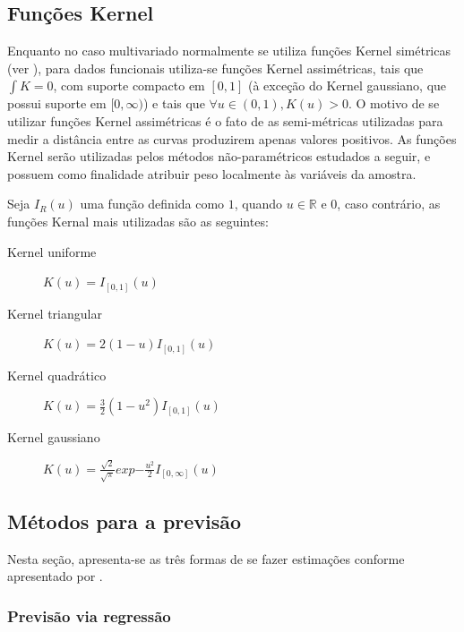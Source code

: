 \documentclass[
	12pt,				%
	openright,			%
	oneside,			%
	a4paper,			%
	english,			%
	brazil				%
	]{dissertacao-ufrgs-abntex2}
\begin{document}
\subsection{Funções Kernel}

Enquanto no caso multivariado normalmente se utiliza funções Kernel simétricas (ver ), para dados funcionais utiliza-se funções Kernel assimétricas, tais que $\int K = 0$, com suporte compacto em $[0,1]$ (à exceção do Kernel gaussiano, que possui suporte em $[0,\infty)$) e tais que $\forall u \in (0,1), K(u) > 0$. O motivo de se utilizar funções Kernel assimétricas é o fato de as semi-métricas utilizadas para medir a distância entre as curvas produzirem apenas valores positivos. As funções Kernel serão utilizadas pelos métodos não-paramétricos estudados a seguir, e possuem como finalidade atribuir peso localmente às variáveis da amostra.

Seja $I_R(u)$ uma função definida como $1$, quando $u \in \mathbb{R}$ e 0, caso contrário, as funções Kernal mais utilizadas são as seguintes:
\begin{description}
	\item[Kernel uniforme] $K(u)= I_{[0,1]}(u)$
    \item[Kernel triangular] $K(u)= 2(1-u)I_{[0,1]}(u)$
    \item[Kernel quadrático] $K(u)= \frac {3}{2} (1 - u^2) I_{[0,1]}(u)$
    \item[Kernel gaussiano] $K(u)= \frac {\sqrt{2}}{\sqrt{\pi}} exp{-\frac{u^2}{2}} I_{[0,\infty]}(u)$
\end{description}

\subsection{Métodos para a previsão}
\label{metodos-previsao-npfda}

Nesta seção, apresenta-se as três formas de se fazer estimações conforme apresentado por .


\subsubsection*{Previsão via regressão}
\end{document}
